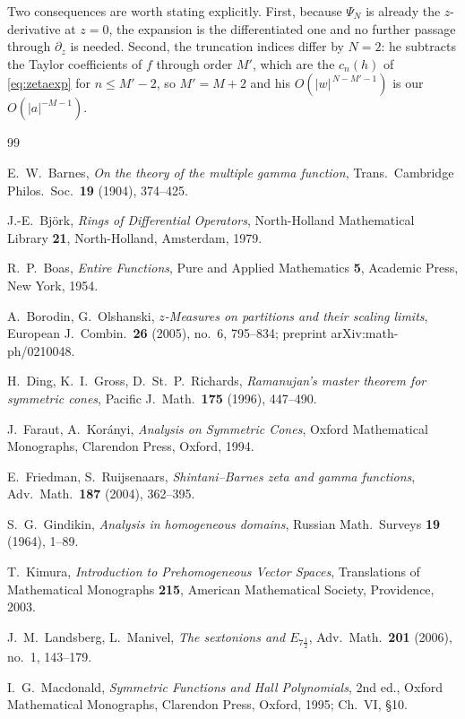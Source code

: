 \documentclass[11pt,letterpaper]{article}
\begin{document}
\smallskip
\noindent
Two consequences are worth stating explicitly. First, because $\Psi_N$ is already
the $z$-derivative at $z=0$, the expansion \cite[(3.13)]{Ruij} is the
differentiated one and no further passage through $\partial_z$ is needed. Second,
the truncation indices differ by $N=2$: he subtracts the Taylor coefficients of
$f$ through order $M'$, which are the $c_n(h)$ of \eqref{eq:zetaexp} for
$n\le M'-2$, so $M'=M+2$ and his $O(|w|^{\,N-M'-1})$ is our
$O(\lvert a\rvert^{-M-1})$.

\begin{thebibliography}{99}

 E.~W.~Barnes,
\emph{On the theory of the multiple gamma function},
Trans.\ Cambridge Philos.\ Soc.\ \textbf{19} (1904), 374--425.

 J.-E.~Bj\"ork,
\emph{Rings of Differential Operators},
North-Holland Mathematical Library \textbf{21},
North-Holland, Amsterdam, 1979.

 R.~P.~Boas,
\emph{Entire Functions},
Pure and Applied Mathematics \textbf{5}, Academic Press, New York, 1954.

 A.~Borodin, G.~Olshanski,
\emph{$z$-Measures on partitions and their scaling limits},
European J.\ Combin.\ \textbf{26} (2005), no.~6, 795--834;
preprint arXiv:math-ph/0210048.

 H.~Ding, K.~I.~Gross, D.~St.~P.~Richards,
\emph{Ramanujan's master theorem for symmetric cones},
Pacific J.\ Math.\ \textbf{175} (1996), 447--490.

 J.~Faraut, A.~Kor\'anyi,
\emph{Analysis on Symmetric Cones},
Oxford Mathematical Monographs, Clarendon Press, Oxford, 1994.

 E.~Friedman, S.~Ruijsenaars,
\emph{Shintani--Barnes zeta and gamma functions},
Adv.\ Math.\ \textbf{187} (2004), 362--395.

 S.~G.~Gindikin,
\emph{Analysis in homogeneous domains},
Russian Math.\ Surveys \textbf{19} (1964), 1--89.

 T.~Kimura,
\emph{Introduction to Prehomogeneous Vector Spaces},
Translations of Mathematical Monographs \textbf{215},
American Mathematical Society, Providence, 2003.

 J.~M.~Landsberg, L.~Manivel,
\emph{The sextonions and $E_{7\frac12}$},
Adv.\ Math.\ \textbf{201} (2006), no.~1, 143--179.

 I.~G.~Macdonald,
\emph{Symmetric Functions and Hall Polynomials}, 2nd ed.,
Oxford Mathematical Monographs, Clarendon Press, Oxford, 1995; Ch.~VI, \S10.


\end{thebibliography}
\end{document}
